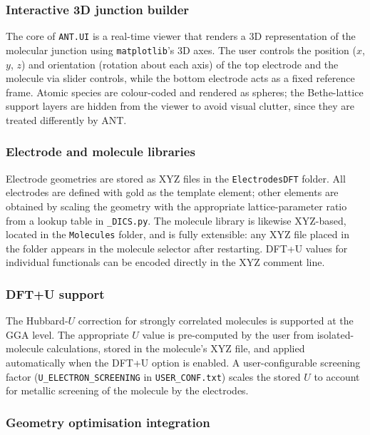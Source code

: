 \documentclass[preprint,12pt, a4paper]{elsarticle}
\begin{document}
\subsubsection*{Interactive 3D junction builder}

The core of \texttt{ANT.UI} is a real-time viewer that renders a 3D representation of the molecular junction using \texttt{matplotlib}'s 3D axes. The user controls the position ($x$, $y$, $z$) and orientation (rotation about each axis) of the top electrode and the molecule via slider controls, while the bottom electrode acts as a fixed reference frame. Atomic species are colour-coded and rendered as spheres; the Bethe-lattice support layers are hidden from the viewer to avoid visual clutter, since they are treated differently by ANT.

\subsubsection*{Electrode and molecule libraries}

Electrode geometries are stored as XYZ files in the \texttt{ElectrodesDFT} folder. All electrodes are defined with gold as the template element; other elements are obtained by scaling the geometry with the appropriate lattice-parameter ratio from a lookup table in \texttt{\_DICS.py}. The molecule library is likewise XYZ-based, located in the \texttt{Molecules} folder, and is fully extensible: any XYZ file placed in the folder appears in the molecule selector after restarting. DFT+U values for individual functionals can be encoded directly in the XYZ comment line.

\subsubsection*{DFT+U support}

The Hubbard-$U$ correction for strongly correlated molecules is supported at the GGA level. The appropriate $U$ value is pre-computed by the user from isolated-molecule calculations, stored in the molecule's XYZ file, and applied automatically when the DFT+U option is enabled. A user-configurable screening factor (\texttt{U\_ELECTRON\_SCREENING} in \texttt{USER\_CONF.txt}) scales the stored $U$ to account for metallic screening of the molecule by the electrodes.

\subsubsection*{Geometry optimisation integration}
\end{document}
